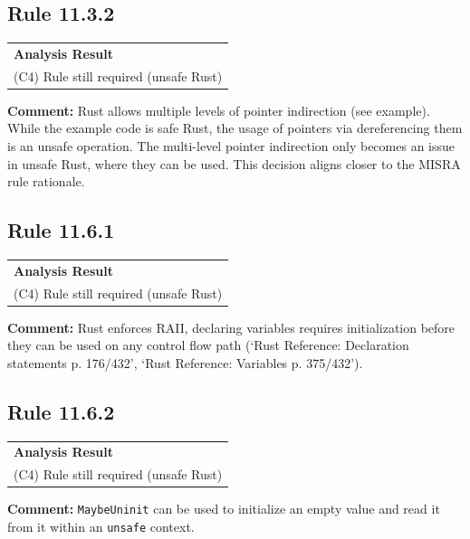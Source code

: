 \subsection*{Rule 11.3.2}
\begin{longtable}{p{13cm}}
\textbf{Analysis Result} \\
(C4) Rule still required (unsafe Rust) \\
\end{longtable}
\textbf{Comment:} Rust allows multiple levels of pointer indirection (see example). While the example code is safe Rust, the usage of pointers via dereferencing them is an unsafe operation. The multi-level pointer indirection only becomes an issue in unsafe Rust, where they can be used. This decision aligns closer to the MISRA rule rationale. \\


\subsection*{Rule 11.6.1}
\begin{longtable}{p{13cm}}
\textbf{Analysis Result} \\
(C4) Rule still required (unsafe Rust) \\
\end{longtable}
\textbf{Comment:} Rust enforces RAII, declaring variables requires initialization before they can be used on any control flow path (`Rust Reference: Declaration statements p. 176/432', `Rust Reference: Variables p. 375/432'). \\


\subsection*{Rule 11.6.2}
\begin{longtable}{p{13cm}}
\textbf{Analysis Result} \\
(C4) Rule still required (unsafe Rust) \\
\end{longtable}
\textbf{Comment:} \texttt{MaybeUninit} can be used to initialize an empty value and read it from it within an \texttt{unsafe} context. \\


